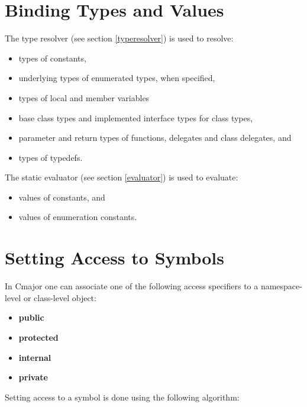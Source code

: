 \documentclass[a4paper,oneside,11pt]{book}
\theoremstyle{definition}
\begin{document}
\section{Binding Types and Values}

The type resolver (see section \ref{typeresolver}) is used to resolve:
\begin{itemize}
\item
types of constants,
\item
underlying types of enumerated types, when specified,
\item
types of local and member variables
\item
base class types and implemented interface types for class types,
\item
parameter and return types of functions, delegates and class delegates, and
\item
types of typedefs.
\end{itemize}

The static evaluator (see section \ref{evaluator}) is used to evaluate:
\begin{itemize}
\item
values of constants, and
\item
values of enumeration constants.
\end{itemize}

\section{Setting Access to Symbols}

In Cmajor one can associate one of the following access specifiers to a namespace-level or class-level object:
\begin{itemize}
\item
\textbf{public}
\item
\textbf{protected}
\item
\textbf{internal}
\item
\textbf{private}
\end{itemize}
Setting access to a symbol is done using the following algorithm:
\end{document}
